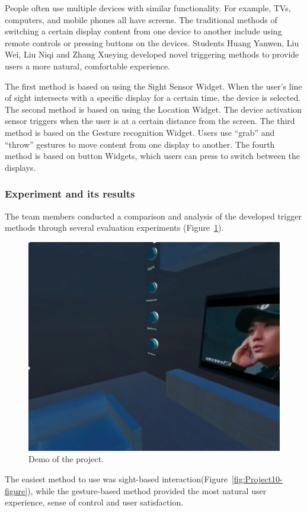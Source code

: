 People often use multiple devices with similar functionality. For example, TVs, computers, and mobile phones all have screens. The traditional methods of switching a certain display content from one device to another include using remote controls or pressing buttons on the devices. Students Huang Yanwen, Liu Wei, Liu Niqi and Zhang Xueying developed novel triggering methods to provide users a more natural, comfortable experience.

The first method is based on using the Sight Sensor Widget. When the user's line of sight intersects with a specific display for a certain time, the device is selected. The second method is based on using the Location Widget. The device activation sensor triggers when the user is at a certain distance from the screen. The third method is based on the Gesture recognition Widget. Users use ``grab'' and ``throw'' gestures to move content from one display to another. The fourth method is based on button Widgets, which users can press to switch between the displays.

\subsubsection{Experiment and its results}

The team members conducted a comparison and analysis of the developed trigger methods through several evaluation experiments (Figure~\ref{fig:Project2-figure}).

\begin{figure}
  \centering
  \includegraphics[width=0.6\linewidth]{figures/Project_2.png}
  \caption{Demo of the project.}
  \label{fig:Project2-figure}
\end{figure}

The easiest method to use was sight-based interaction(Figure~\ref{fig:Project10-figure}), while the gesture-based method provided the most natural user experience, sense of control and user satisfaction.

